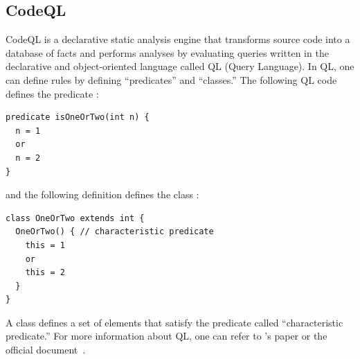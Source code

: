 \subsection{CodeQL}

CodeQL is a declarative static analysis engine that transforms source code into
a database of facts and performs analyses by evaluating queries written in the
declarative and object-oriented language called QL (Query Language).  In QL,
one can define rules by defining ``predicates'' and ``classes.'' The following
QL code defines the predicate :

\begin{lstlisting}[style=codeql,xleftmargin=2.5em]
predicate isOneOrTwo(int n) {
  n = 1
  or
  n = 2
}
\end{lstlisting}

\noindent
and the following definition defines the class :

\begin{lstlisting}[style=codeql,xleftmargin=2.5em]
class OneOrTwo extends int {
  OneOrTwo() { // characteristic predicate
    this = 1
    or
    this = 2
  }
}
\end{lstlisting}

\noindent
A class defines a set of elements that satisfy the predicate called
``characteristic predicate.'' For more information about QL, one can refer to
\citet{ql2016}'s paper or the official document~\cite{codeql}.



